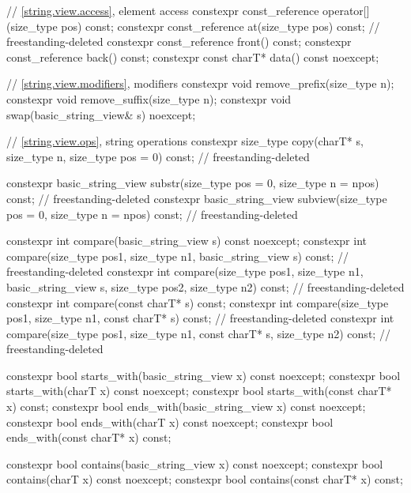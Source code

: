 \begin{codeblock}
{{    // \ref{string.view.access}, element access
    constexpr const_reference operator[](size_type pos) const;
    constexpr const_reference at(size_type pos) const;                  // freestanding-deleted
    constexpr const_reference front() const;
    constexpr const_reference back() const;
    constexpr const charT* data() const noexcept;

    // \ref{string.view.modifiers}, modifiers
    constexpr void remove_prefix(size_type n);
    constexpr void remove_suffix(size_type n);
    constexpr void swap(basic_string_view& s) noexcept;

    // \ref{string.view.ops}, string operations
    constexpr size_type copy(charT* s, size_type n,
                             size_type pos = 0) const;                  // freestanding-deleted

    constexpr basic_string_view substr(size_type pos = 0,
                                       size_type n = npos) const;       // freestanding-deleted
    constexpr basic_string_view subview(size_type pos = 0,
                                        size_type n = npos) const;      // freestanding-deleted

    constexpr int compare(basic_string_view s) const noexcept;
    constexpr int compare(size_type pos1, size_type n1,
                          basic_string_view s) const;                   // freestanding-deleted
    constexpr int compare(size_type pos1, size_type n1, basic_string_view s,
                          size_type pos2, size_type n2) const;          // freestanding-deleted
    constexpr int compare(const charT* s) const;
    constexpr int compare(size_type pos1, size_type n1,
                          const charT* s) const;                        // freestanding-deleted
    constexpr int compare(size_type pos1, size_type n1, const charT* s,
                          size_type n2) const;                          // freestanding-deleted

    constexpr bool starts_with(basic_string_view x) const noexcept;
    constexpr bool starts_with(charT x) const noexcept;
    constexpr bool starts_with(const charT* x) const;
    constexpr bool ends_with(basic_string_view x) const noexcept;
    constexpr bool ends_with(charT x) const noexcept;
    constexpr bool ends_with(const charT* x) const;

    constexpr bool contains(basic_string_view x) const noexcept;
    constexpr bool contains(charT x) const noexcept;
    constexpr bool contains(const charT* x) const;

}}
\end{codeblock}
